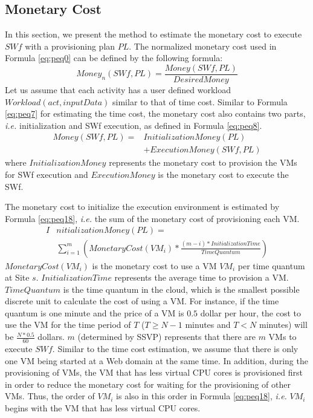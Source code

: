 \subsection{Monetary Cost}
\label{subsec:PMC}

In this section, we present the method to estimate the monetary cost to execute $SWf$ with a provisioning plan $PL$. The normalized monetary cost used in Formula \ref{eq:peq0} can be defined by the following formula:
\begin{equation}\label{eq:peq4}
\boxed{
Money_n( SWf, PL ) = \frac{Money( SWf, PL )}{DesiredMoney}
}
\end{equation}
Let us assume that each activity has a user defined workload $Workload(act, inputData)$ similar to that of time cost. 
Similar to Formula \ref{eq:peq7} for estimating the time cost, the monetary cost also contains two parts, \textit{i.e.} initialization and SWf execution, as defined in Formula \ref{eq:peq8}.
\begin{equation}\label{eq:peq8}
\boxed{
\begin{split}
Money( SWf, PL ) = & InitializationMoney( PL ) \\& + ExecutionMoney( SWf, PL )
\end{split}
}
\end{equation}
where $InitializationMoney$ represents the monetary cost to provision the VMs for SWf execution and $ExecutionMoney$ is the monetary cost to execute the SWf.

The monetary cost to initialize the execution environment is estimated by Formula \ref{eq:peq18}, \textit{i.e.} the sum of the monetary cost of provisioning each VM.
\begin{equation}\label{eq:peq18}
\boxed{
\begin{split}
I&nitializationMoney( PL ) = \\& \sum_{i=1}^{m}(MonetaryCost(VM_i) * \frac{( m - i ) * InitializationTime}{TimeQuantum})
\end{split}
}
\end{equation}
$MonetaryCost(VM_i)$ is the monetary cost to use a VM $VM_i$ per time quantum at Site $s$.
$InitializationTime$ represents the average time to provision a VM.
$TimeQuantum$ is the time quantum in the cloud, which is the smallest possible discrete unit to calculate the cost of using a VM. 
For instance, if the time quantum is one minute and the price of a VM is $0.5$ dollar per hour, the cost to use the VM for the time period of $T$ ($T \geq N - 1$ minutes and $T < N$ minutes) will be $\frac{N * 0.5}{60}$ dollars.
$m$ (determined by SSVP) represents that there are $m$ VMs to execute $SWf$.
Similar to the time cost estimation, we assume that there is only one VM being started at a Web domain at the same time. In addition, during the provisioning of VMs, the VM that has less virtual CPU cores is provisioned first in order to reduce the monetary cost for waiting for the provisioning of other VMs. Thus, the order of $VM_i$ is also in this order in Formula \ref{eq:peq18}, \textit{i.e.} $VM_i$ begins with the VM that has less virtual CPU cores.


